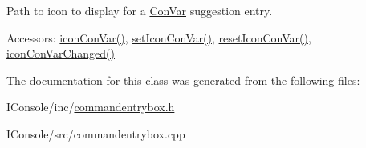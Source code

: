 Path to icon to display for a \hyperlink{class_con_var}{Con\-Var} suggestion entry. 

\begin{DoxyParagraph}{Accessors\-:}
\hyperlink{class_command_entry_box_ad069b345272bd9d2fe43266ac5ead588}{icon\-Con\-Var()}, \hyperlink{class_command_entry_box_a9e4387c47cb2de50da44360110d9e59a}{set\-Icon\-Con\-Var()}, \hyperlink{class_command_entry_box_a85705eaae1055472de96c07142cf56af}{reset\-Icon\-Con\-Var()}, \hyperlink{class_command_entry_box_a971a6587e79b6420a09963c09daa61a4}{icon\-Con\-Var\-Changed()} 
\end{DoxyParagraph}


The documentation for this class was generated from the following files\-:\begin{DoxyCompactItemize}
\item 
I\-Console/inc/\hyperlink{commandentrybox_8h}{commandentrybox.\-h}\item 
I\-Console/src/commandentrybox.\-cpp\end{DoxyCompactItemize}
